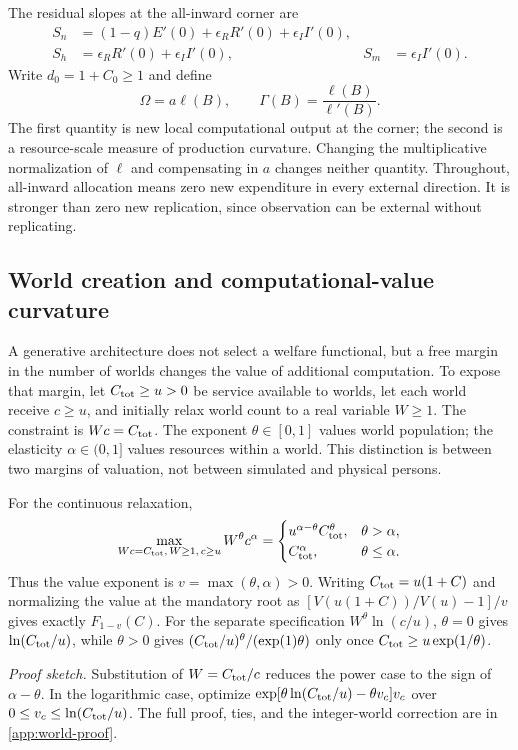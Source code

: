 The residual slopes at the all-inward corner are
\begin{align}
 S_n&=(1-q)E'(0)+\epsilon_RR'(0)+\epsilon_II'(0),\nonumber\\
 S_h&=\epsilon_RR'(0)+\epsilon_II'(0),&
 S_m&=\epsilon_II'(0).
 \label{eq:slopes}
\end{align}
Write $d_0=1+C_0\geq1$ and define
\begin{equation}
 \Omega=a\ell(B),\qquad
 \Gamma(B)=\frac{\ell(B)}{\ell'(B)}.
 \label{eq:omega-gamma}
\end{equation}
The first quantity is new local computational output at the corner;
the second is a resource-scale measure of production curvature.
Changing the multiplicative normalization of $\ell$ and compensating in
$a$ changes neither quantity. Throughout, all-inward allocation means
zero new expenditure in every external direction. It is stronger than
zero new replication, since observation can be external without
replicating.

\subsection{World creation and computational-value curvature}
\label{sec:world-value}
A generative architecture does not select a welfare functional, but a free
margin in the number of worlds changes the value of additional computation.
To expose that margin, let $C_{\rm tot}\geq u>0$ be service available to
worlds, let each world receive $c\geq u$, and initially relax world count
to a real variable $W\geq1$. The constraint is $Wc=C_{\rm tot}$. The
exponent $\theta\in[0,1]$ values world population; the elasticity
$\alpha\in(0,1]$ values resources within a world. This distinction is
between two margins of valuation, not between simulated and physical
persons.

\begin{lemma}
\label{lem:world-curvature}
For the continuous relaxation,
\begin{equation}
 \max_{Wc=C_{\rm tot},\,W\geq1,\,c\geq u}W^\theta c^\alpha
 =\begin{cases}
 u^{\alpha-\theta}C_{\rm tot}^{\theta},&\theta>\alpha,\\
 C_{\rm tot}^{\alpha},&\theta\leq\alpha.
 \end{cases}
 \label{eq:world-value}
\end{equation}
Thus the value exponent is $v=\max(\theta,\alpha)>0$. Writing
$C_{\rm tot}=u(1+C)$ and normalizing the value at the mandatory root
as $[V(u(1+C))/V(u)-1]/v$ gives exactly $F_{1-v}(C)$.
For the separate specification $W^\theta\ln(c/u)$, $\theta=0$ gives
$\ln(C_{\rm tot}/u)$, while $\theta>0$ gives
$(C_{\rm tot}/u)^\theta/(\exp(1)\theta)$ only once
$C_{\rm tot}\geq u\exp(1/\theta)$.
\end{lemma}
\noindent\emph{Proof sketch.}
Substitution of $W=C_{\rm tot}/c$ reduces the power case to the sign
of $\alpha-\theta$. In the logarithmic case, optimize
$\exp[\theta\ln(C_{\rm tot}/u)-\theta v_c]v_c$ over
$0\leq v_c\leq\ln(C_{\rm tot}/u)$. The full proof, ties, and the
integer-world correction are in \cref{app:world-proof}.

